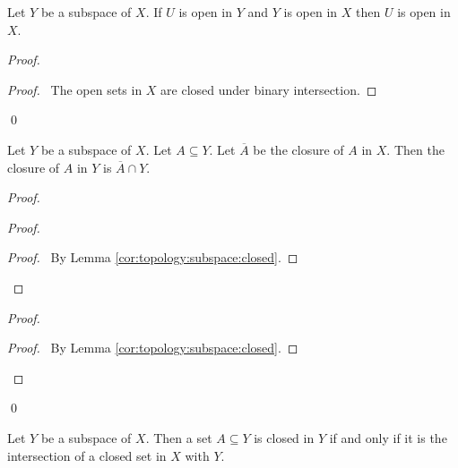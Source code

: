 \begin{lm}
  \label{lm:topology:subspace:open}
  Let $Y$ be a subspace of $X$. If $U$ is open in $Y$ and $Y$ is open in $X$
  then $U$ is open in $X$.
\end{lm}

\begin{proof}
  \pf
  \begin{proof}
    \pf\ The open sets in $X$ are closed under binary intersection.
  \end{proof}
  \qed
\end{proof}

\begin{thm}
  \label{thm:topology:subspace:closure}
  Let $Y$ be a subspace of $X$. Let $A \subseteq Y$. Let $\overline{A}$ be
  the
  closure of $A$ in $X$. Then the closure of $A$ in $Y$ is $\overline{A} \cap
  Y$.
\end{thm}

\begin{proof}
  \pf
  \begin{proof}
    \begin{proof}
      \pf\ By Lemma \ref{cor:topology:subspace:closed}.
    \end{proof}
  \end{proof}
  \begin{proof}
    \begin{proof}
      \pf\ By Lemma \ref{cor:topology:subspace:closed}.
    \end{proof}
  \end{proof}
  \qed
\end{proof}

\begin{cor}
  \label{cor:topology:subspace:closed}
  Let $Y$ be a subspace of $X$. Then a set $A \subseteq Y$ is closed in $Y$
  if
  and only if it is the intersection of a closed set in $X$ with $Y$.
\end{cor}

